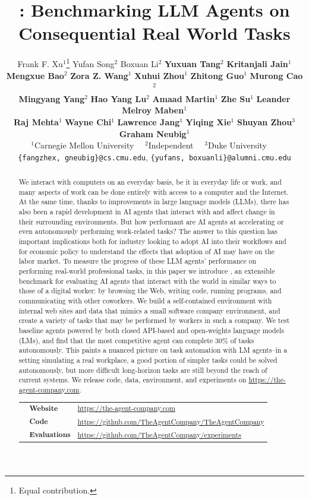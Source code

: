 \documentclass{article}
\title{\tac: Benchmarking LLM Agents on Consequential Real World Tasks}
\author{%
Frank F. Xu$^1$\thanks{Equal contribution.} \quad
  Yufan Song$^2$\footnotemark[1] \quad
  Boxuan Li$^2$\footnotemark[1] \quad
  \textbf{Yuxuan Tang$^2$} \quad
  \textbf{Kritanjali Jain$^1$}  \\ 
  \textbf{Mengxue Bao$^2$} \quad
  \textbf{Zora Z. Wang$^1$} \quad
  \textbf{Xuhui Zhou$^1$} \quad
  \textbf{Zhitong Guo$^1$} \quad 
  \textbf{Murong Cao$^2$} \\  
  \textbf{Mingyang Yang$^2$} \quad 
  \textbf{Hao Yang Lu$^2$} \quad 
  \textbf{Amaad Martin$^1$} \quad 
  \textbf{Zhe Su$^1$} \quad 
  \textbf{Leander Melroy Maben$^1$} \quad \\
  \textbf{Raj Mehta$^1$} \quad 
  \textbf{Wayne Chi$^1$} \quad
  \textbf{Lawrence Jang$^1$} \quad
  \textbf{Yiqing Xie$^1$} \quad
  \textbf{Shuyan Zhou$^3$} \quad
  \textbf{Graham Neubig$^1$} \\ 
  $^1$Carnegie Mellon University \ \
$^2$Independent \ \
$^3$Duke University \ \
 \\
  \texttt{\{fangzhex, gneubig\}@cs.cmu.edu}, \texttt{\{yufans, boxuanli\}@alumni.cmu.edu}\\
}
\begin{document}
\maketitle


\begin{abstract}
We interact with computers on an everyday basis, be it in everyday life or work, and many aspects of work can be done entirely with access to a computer and the Internet.
At the same time, thanks to improvements in large language models (LLMs), there has also been a rapid development in AI agents that interact with and affect change in their surrounding environments.
But how performant are AI agents at accelerating or even autonomously performing work-related tasks?
The answer to this question has important implications both for industry looking to adopt AI into their workflows and for economic policy to understand the effects that adoption of AI may have on the labor market.
To measure the progress of these LLM agents' performance on performing real-world professional tasks,
in this paper we introduce \tac, an extensible benchmark for evaluating AI agents that interact with the world in similar ways to those of a digital worker: by browsing the Web, writing code, running programs, and communicating with other coworkers.
We build a self-contained environment with internal web sites and data that mimics a small software company environment, and create a variety of tasks that may be performed by workers in such a company.
We test baseline agents powered by both closed API-based and open-weights language models (LMs), and find that the most competitive agent can complete 30\% of tasks autonomously.
This paints a nuanced picture on task automation with LM agents--in a setting simulating a real workplace, a good portion of simpler tasks could be solved autonomously, but more difficult long-horizon tasks are still beyond the reach of current systems. We release code, data, environment, and experiments on \url{https://the-agent-company.com}.

\begin{center}
\begin{tabular}{rll}
    \browse & \textbf{\small{Website}} & \url{https://the-agent-company.com} \\
    \github & \textbf{\small{Code}} & \url{https://github.com/TheAgentCompany/TheAgentCompany} \\
    \desktop & \textbf{\small{Evaluations}} & \url{https://github.com/TheAgentCompany/experiments}\\
\end{tabular}
\end{center}

\end{abstract}
\end{document}
